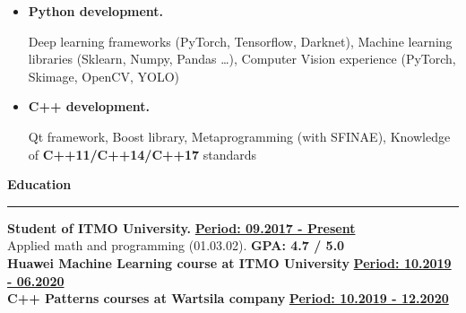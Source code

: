 \documentclass[11pt,a4paper]{report}
\begin{document}
\begin{itemize}[label={}]

\item \textbf{Python development.}

Deep learning frameworks (PyTorch, Tensorflow, Darknet), Machine learning libraries (Sklearn, Numpy, Pandas \dots), Computer Vision experience (PyTorch, Skimage, OpenCV, YOLO)

\item \textbf{C++ development.}

Qt framework, Boost library, Metaprogramming (with SFINAE), Knowledge of \textbf{C++11/C++14/C++17} standards
\end{itemize}


\par\hbox{\Large\textbf{Education}}\kern5pt\hrule\kern5pt

\textbf{Student of ITMO University.}
\hfill
\textbf{\underline{Period: 09.2017 - Present}} \\


Applied math and programming (01.03.02).
\hfill
\textbf{\Large GPA: 4.7 / 5.0} \\


\textbf{Huawei Machine Learning course at ITMO University}
\hfill
\textbf{\underline{Period: 10.2019 - 06.2020}} \\

\textbf{C++ Patterns courses at Wartsila company}
\hfill
\textbf{\underline{Period: 10.2019 - 12.2020}} \\
\end{document}
